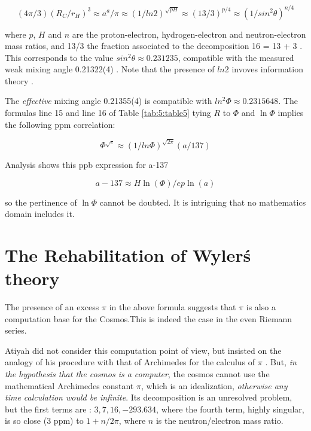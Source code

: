 \documentclass[a4paper,9pt]{article}
\begin{document}
\begin{equation}
    (4\pi /3) (R_C/r_H)^3 \approx a^a/\pi \approx (1/ln2)^{\sqrt{pH}} \approx (13/3)^{p/4} \approx (1/sin^2\theta)^{n/4} 
\end{equation}

where $p$, $H$ and $n$ are the proton-electron, hydrogen-electron and neutron-electron mass ratios, and 13/3 the fraction associated to the decomposition 16 = 13 + 3 \cite{Sanchez1}. This corresponds to the value $sin^2\theta \approx 0.231235$, compatible with the measured weak mixing angle 0.21322(4) \cite{Tanabashi}. Note that the presence of $ln2$ invoves information theory \cite{Shannon}. 

The \textit {effective} mixing angle 0.21355(4) \cite{Tanabashi} is compatible with $ln^2\Phi \approx 0.2315648$. The formulas line 15 and line 16 of Table \ref{tab:5:table5} tying $R$ to $\Phi$ and $\ln\Phi$ implies the following ppm correlation: 

\begin{equation}
    \Phi^{\sqrt e} \approx (1/ln\Phi)^{\sqrt {2\pi}} (a/137)
\end{equation}

Analysis shows this ppb expression for a-137

\begin{equation}
   a - 137 \approx H \ln(\Phi) /ep\ln(a)
\end{equation}

so the pertinence of $\ln\Phi$ cannot be doubted. It is intriguing that no mathematics domain includes it.







\section{The Rehabilitation of Wyler\'s theory}
The presence of an excess $\pi$ in the above formula suggests that $\pi$ is also a computation base for the Cosmos.This is indeed the case in the even Riemann series.


Atiyah did not consider this computation point of view, but insisted on the analogy of his procedure with that of Archimedes for the calculus of $\pi$ \cite{Atiyah}. But, \textit {in the hypothesis that the cosmos is a computer}, the cosmos cannot use the mathematical Archimedes constant $\pi$, which is an idealization, \textit {otherwise any time calculation would be infinite}. Its decomposition is an unresolved problem, but the first terms are : $3, 7, 16, -293.634$, where the fourth term, highly singular, is so close (3 ppm) to $1 + n/2\pi$, where $n$ is the neutron/electron mass ratio.
\end{document}
